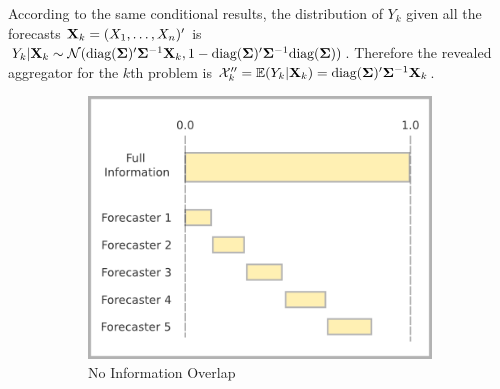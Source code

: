 \documentclass[11pt]{article}
\newcommand{\E}{\mathbb{E}}
\theoremstyle{definition}
\theoremstyle{definition}
\def\bSigma{{\bf \Sigma}}
\def\X{{\bf X}}
\def\E{{\mathbb E}}
\def\diag{\text{diag}}
\def\diag{\text{diag}}
\begin{document}
According to the same conditional results, the distribution of $Y_k$ given all the forecasts $\X_k = (X_1, \dots, X_n)'$ is $Y_k | \X_k \sim \mathcal{N}(\diag(\bSigma)'\bSigma^{-1}\X_k, 1- \diag(\bSigma)'\bSigma^{-1}\diag(\bSigma))$. Therefore the revealed aggregator for the $k$th problem is  $\mathcal{X}_k''  = \E(Y_k | \X_k) = \diag(\bSigma)'\bSigma^{-1}\X_k$. 




\begin{figure}[t!]
        \centering
        \begin{subfigure}[b]{0.49\textwidth}
                \includegraphics[width=\textwidth]{IndepDiagram}
                \caption{No Information Overlap}
                \label{DiagramsA}
        \end{subfigure}%
        ~ %
        \begin{subfigure}[b]{0.49\textwidth}

\end{subfigure}
\end{figure}
\end{document}
